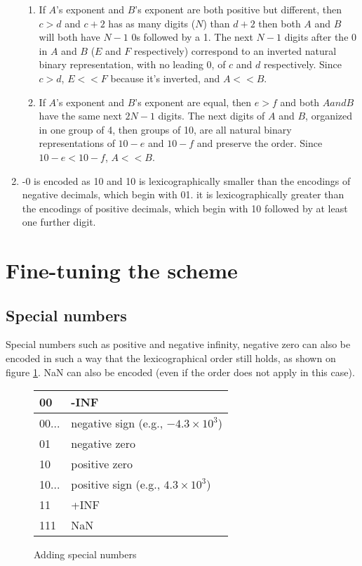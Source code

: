 \documentclass{acm_proc_article-sp}
\begin{document}
\begin{enumerate}
\begin{enumerate}
  \item If $A$'s exponent and $B$'s exponent are both positive but different, then $c > d$ and $c+2$ has as many digits ($N$) than $d+2$ then both $A$ and $B$ will both have $N-1$ 0s followed by a 1. The next $N-1$ digits after the 0 in $A$ and $B$ ($E$ and $F$ respectively) correspond to an inverted natural binary representation, with no leading 0, of $c$ and $d$ respectively. Since $c > d$, $E << F$ because it's inverted, and $A << B$.
  \item If $A$'s exponent and $B$'s exponent are equal, then $e > f$ and both $A and B$ have the same next $2N-1$ digits. The next digits of $A$ and $B$, organized in one group of 4, then groups of 10, are all natural binary representations of $10-e$ and $10-f$ and preserve the order. Since $10-e < 10-f$, $A << B$.
  \end{enumerate}
\item -0 is encoded as 10 and 10 is lexicographically smaller than the encodings of negative decimals, which begin with 01. it is lexicographically greater than the encodings of positive decimals, which begin with 10 followed by at least one further digit.
\end{enumerate}

\section{Fine-tuning the scheme}

\subsection{Special numbers}

Special numbers such as positive and negative infinity, negative zero can also be encoded in such a way that the lexicographical order still holds, as shown on figure \ref{figure-sign-extended}. NaN can also be encoded (even if the order does not apply in this case).

\begin{figure}
\caption{Adding special numbers}
\label{figure-sign-extended}
\center
\begin{tabular}{|l|l|}
\hline
00 & -INF \\
\hline
00... &  negative sign (e.g., $-4.3\times10^3$)\\
\hline
01 & negative zero \\
\hline
10 & positive zero \\
\hline
10... & positive sign (e.g., $4.3\times10^3$)\\
\hline
11 & +INF \\
\hline
111 & NaN \\
\hline
\end{tabular}
\end{figure}
\end{document}
